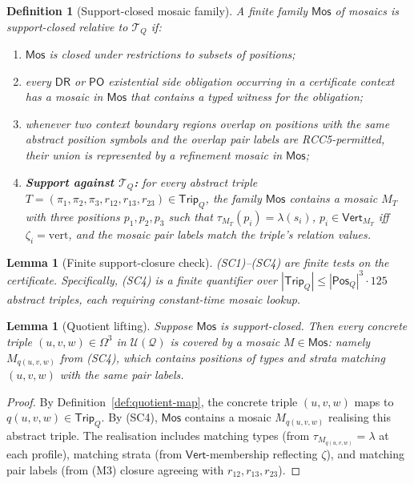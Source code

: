 \documentclass[11pt]{article}
\newtheorem{lemma}[theorem]{Lemma}
\newtheorem{definition}[theorem]{Definition}
\newcommand{\DR}{\mathsf{DR}}
\newcommand{\PO}{\mathsf{PO}}
\newcommand{\Q}{\mathcal Q}
\newcommand{\U}{\mathcal U}
\newcommand{\Mos}{\mathsf{Mos}}
\newcommand{\Vrt}{\mathsf{Vert}}
\newcommand{\vertical}{\mathrm{vert}}
\newcommand{\Pos}{\mathsf{Pos}}
\newcommand{\Trip}{\mathsf{Trip}}
\begin{document}
\begin{definition}[Support-closed mosaic family]\label{def:support-closed}
A finite family $\Mos$ of mosaics is \emph{support-closed} relative
to $\mathcal T_Q$ if:
\begin{enumerate}[label=(SC\arabic*)]
\item $\Mos$ is closed under restrictions to subsets of positions;
\item every $\DR$ or $\PO$ existential side obligation occurring in
a certificate context has a mosaic in $\Mos$ that contains a typed
witness for the obligation;
\item whenever two context boundary regions overlap on positions
with the same abstract position symbols and the overlap pair labels
are RCC5-permitted, their union is represented by a refinement
mosaic in $\Mos$;
\item \textbf{Support against $\mathcal T_Q$:} for every abstract
triple $T=(\pi_1,\pi_2,\pi_3,r_{12},r_{13},r_{23})\in\Trip_Q$, the
family $\Mos$ contains a mosaic $M_T$ with three positions
$p_1,p_2,p_3$ such that $\tau_{M_T}(p_i)=\lambda(s_i)$,
$p_i\in\Vrt_{M_T}$ iff $\zeta_i=\vertical$, and the mosaic pair
labels match the triple's relation values.
\end{enumerate}
\end{definition}

\begin{lemma}[Finite support-closure check]\label{lem:sc-finite}
(SC1)--(SC4) are finite tests on the certificate.  Specifically,
(SC4) is a finite quantifier over $|\Trip_Q|\le|\Pos_Q|^3\cdot125$
abstract triples, each requiring constant-time mosaic lookup.
\end{lemma}

\begin{lemma}[Quotient lifting]\label{lem:quotient-lift}
Suppose $\Mos$ is support-closed.  Then every concrete triple
$(u,v,w)\in\Omega^3$ in $\U(\Q)$ is covered by a mosaic $M\in\Mos$:
namely $M_{q(u,v,w)}$ from (SC4), which contains positions of
types and strata matching $(u,v,w)$ with the same pair labels.
\end{lemma}

\begin{proof}
By Definition~\ref{def:quotient-map}, the concrete triple $(u,v,w)$
maps to $q(u,v,w)\in\Trip_Q$.  By (SC4), $\Mos$ contains a mosaic
$M_{q(u,v,w)}$ realising this abstract triple.  The realisation
includes matching types (from $\tau_{M_{q(u,v,w)}}=\lambda$ at each
profile), matching strata (from $\Vrt$-membership reflecting
$\zeta$), and matching pair labels (from (M3) closure agreeing with
$r_{12},r_{13},r_{23}$).
\end{proof}
\end{document}
